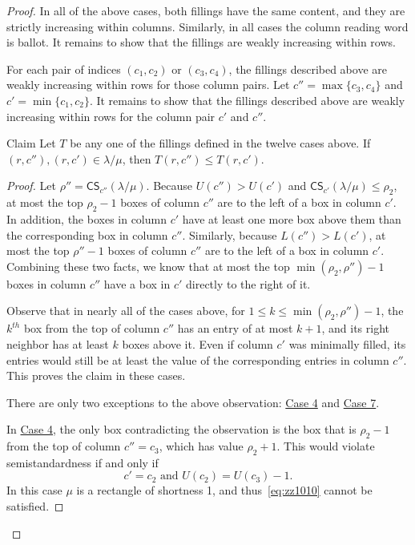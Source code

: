\documentclass[ALCO,ThmDefs,Unicode,epreuves]{cedram}
\newcommand{\CS	}{\mathsf{CS}}
\let\hyperlinka\hyperlink %
\newenvironment{claim}{\begin{enonce}{Claim}}{\end{enonce}}
\begin{document}
\begin{proof}
In all of the above cases, both fillings have the same content, and they are strictly increasing within columns. Similarly, in all cases the column reading word is ballot. It remains to show that the fillings are weakly increasing within rows.

For each pair of indices $(c_1,c_2)$ or $(c_3,c_4)$, the fillings described above are weakly increasing within rows for those column pairs. Let $c'' = \max\{c_3,c_4\}$ and $c' = \min \{c_1,c_2\}$. It remains to show that the fillings described above are weakly increasing within rows for the column pair $c'$ and $c''$.

\begin{claim}
\label{claim:col2col3}
Let $T$ be any one of the fillings defined in the twelve cases above. If $(r,c''),(r,c')\in \lambda/\mu$, then $T(r,c'') \leq T(r,c')$.
\end{claim}

\begin{proof}
Let $\rho'' = \CS _{c''}(\lambda/\mu)$. Because $U(c'')>U(c')$ and $\CS _{c'}(\lambda/\mu)\leq \rho_2$, at most the top $\rho_2-1$ boxes of column $c''$ are to the left of a box in column $c'$. In addition, the boxes in column $c'$ have at least one more box above them than the corresponding box in column $c''$. Similarly, because $L(c'')>L(c')$, at most the top $\rho''-1$ boxes of column $c''$ are to the left of a box in column $c'$. Combining these two facts, we know that at most the top $\min(\rho_2,\rho'')-1$ boxes in column $c''$ have a box in $c'$ directly to the right of it.

Observe that in nearly all of the cases above, for $1\leq k\leq \min(\rho_2,\rho'')-1$, the $k^{th}$ box from the top of column $c''$ has an entry of at most $k+1$, and its right neighbor has at least $k$ boxes above it. Even if column $c'$ was minimally filled, its entries would still be at least the value of the corresponding entries in column $c''$. This proves the claim in these cases.

There are only two exceptions to the above observation: \hyperlinka{prop3.7case_4}{Case 4} and \hyperlinka{prop3.7case_7}{Case 7}.

In \hyperlinka{prop3.7case_4}{Case 4}, the only box contradicting the observation is the box that is $\rho_2-1$ from the top of column $c''=c_3$, which has value $\rho_2+1$. This would violate semistandardness if and only if
\begin{equation}
\label{eq:zz1010}
c'=c_2\text{ and }U(c_2) = U(c_3)-1.
\end{equation}
In this case $\mu$ is a rectangle of shortness 1, and thus~\eqref{eq:zz1010} cannot be satisfied.


\end{proof}
\end{proof}
\end{document}
